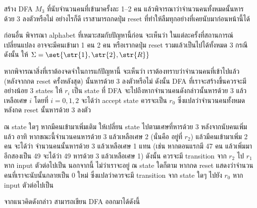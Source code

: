 \begin{example}
สร้าง DFA $M_3$ ที่นับจำนวนคนที่เข้ามาครั้งละ 1--2 คน แล้วพิจารณาว่าจำนวนคนทั้งหมดนั้นหารด้วย 3 ลงตัวหรือไม่ อย่างไรก็ดี เราสามารถกดปุ่ม reset ที่ทำให้ลืมทุกอย่างที่เคยนับมาก่อนหน้านี้ได้

ก่อนอื่น พิจารณา alphabet ที่เหมาะสมกับปัญหานี้ก่อน \enskip จะเห็นว่า ในแต่ละครั้งที่สถานการณ์เปลี่ยนแปลง อาจจะมีคนเข้ามา 1 คน 2 คน หรือเรากดปุ่ม reset รวมแล้วเป็นไปได้ทั้งหมด 3 กรณี \enskip ดังนั้น ให้ $\Sigma=\set{\str{1},\str{2},\str{R}}$

หากพิจารณาสิ่งที่เราต้องจดจำในการแก้ปัญหานี้ จะเห็นว่า เราต้องทราบว่าจำนวนคนที่เข้าไปแล้ว (หลังจากกด reset ครั้งหลังสุด) นั้นหารด้วย 3 ลงตัวหรือไม่ \enskip ดังนั้น DFA ที่เราจะสร้างขึ้นควรจะมีอย่างน้อย 3 states \enskip ให้ $r_i$ เป็น state ที่ DFA จะไปถึงหากจำนวนคนดังกล่าวนั้นหารด้วย 3 แล้วเหลือเศษ $i$ โดยที่ $i=0,1,2$ \enskip จะได้ว่า accept state ควรจะเป็น $r_0$ ซึ่งแปลว่าจำนวนคนทั้งหมดหลังกด reset นั้นหารด้วย 3 ลงตัว

ณ state ใดๆ หากมีคนเข้ามาเพิ่มเติม ให้เปลี่ยน state ไปตามเศษที่หารด้วย 3 หลังจากนับคนเพิ่มแล้ว อาทิ หากขณะนี้จำนวนคนหารด้วย 3 แล้วเหลือเศษ 2 (นั่นคือ อยู่ที่ $r_2$) แล้วมีคนเข้ามาเพิ่ม 2 คน จะได้ว่า จำนวนคนนั้นหารด้วย 3 แล้วเหลือเศษ 1 แทน (เช่น หากตอนแรกมี 47 คน แล้วเพิ่มมาอีกสองเป็น 49 จะได้ว่า 49 หารด้วย 3 แล้วเหลือเศษ 1) ดังนั้น ควรจะมี transition จาก $r_2$ ไป $r_1$ หาก input ตัวต่อไปเป็น  \enskip นอกจากนี้ ไม่ว่าเราจะอยู่ ณ state ใดก็ตาม หากกด reset แสดงว่าจำนวนคนที่เราจะนับนั้นกลายเป็น 0 ใหม่ ซึ่งแปลว่าควรจะมี transition จาก state ใดๆ ไปยัง $r_0$ หาก input ตัวต่อไปเป็น 

จากแนวคิดดังกล่าว สามารถเขียน DFA ออกมาได้ดังนี้
\begin{center}
\end{center}
\end{example}

